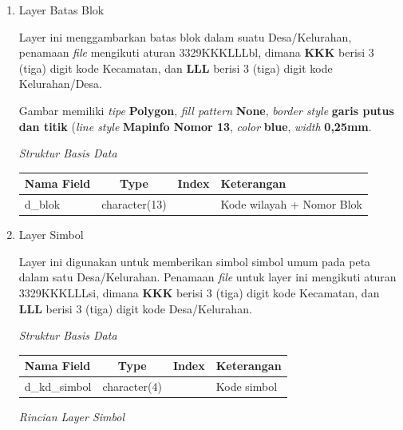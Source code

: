 \begin{enumerate}[\bfseries A.]
\begin{enumerate}[1.]
\begin{enumerate}[1.]
      \item Layer Batas Blok
      
        Layer ini menggambarkan batas blok dalam suatu Desa/Kelurahan, penamaan \textit{file} mengikuti aturan 3329KKKLLLbl, dimana \textbf{KKK} berisi 3 (tiga) digit kode Kecamatan, dan \textbf{LLL} berisi 3 (tiga) digit kode Kelurahan/Desa.
      
        Gambar memiliki \textit{tipe} \textbf{Polygon}, \textit{fill pattern} \textbf{None}, \textit{border style} \textbf{garis putus dan titik} (\textit{line style} \textbf{Mapinfo Nomor 13}, \textit{color} \textbf{blue}, \textit{width} \textbf{0,25mm}.
        
        \textit{Struktur Basis Data}
        
        \begin{tabular}{| l | c | c | p{5cm} |}
          \hline
          Nama Field & Type & Index & Keterangan \\
          \hline
          d\_blok & character(13) & & Kode wilayah + Nomor Blok \\
          \hline
        \end{tabular}
      
      \item Layer Simbol
      
      Layer ini digunakan untuk memberikan simbol simbol umum pada peta dalam satu Desa/Kelurahan. Penamaan \textit{file} untuk layer ini mengikuti aturan 3329KKKLLLsi, dimana \textbf{KKK} berisi 3 (tiga) digit kode Kecamatan, dan \textbf{LLL} berisi 3 (tiga) digit kode Desa/Kelurahan.
      
      \textit{Struktur Basis Data}
      
      \begin{tabular}{| l | c | c | p{5cm} |}
        \hline
        Nama Field & Type & Index & Keterangan \\
        \hline
        d\_kd\_simbol & character(4) & & Kode simbol \\
        \hline
      \end{tabular}
      
      \textit{Rincian Layer Simbol}
      

\end{enumerate}
\end{enumerate}
\end{enumerate}
